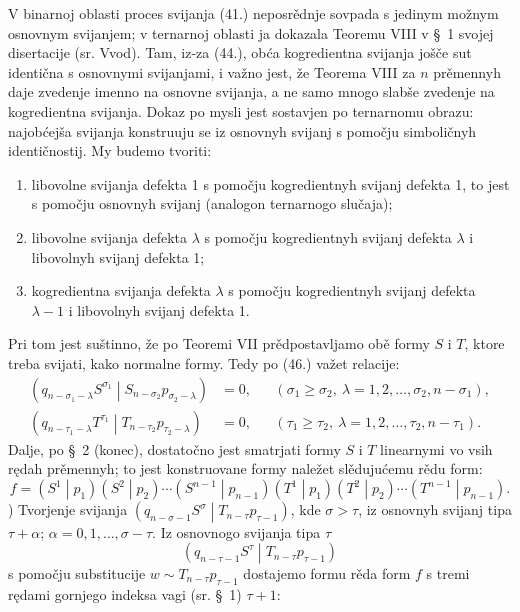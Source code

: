 \documentclass[11pt]{article}
\newcommand{\pair}[2]{\left(#1\middle|#2\right)}
\begin{document}
V binarnoj oblasti proces svijanja (41.) neposrědnje sovpada s jedinym možnym osnovnym svijanjem; v ternarnoj oblasti ja dokazala Teoremu VIII v \S\ 1 svojej disertacije (sr. Vvod). Tam, iz-za (44.), obća kogredientna svijanja jošče sut identična s osnovnymi svijanjami, i važno jest, že Teorema VIII za $n$ prěmennyh daje zvedenje imenno na osnovne svijanja, a ne samo mnogo slabše zvedenje na kogredientna svijanja. Dokaz po mysli jest sostavjen po ternarnomu obrazu: najobćejša svijanja konstruuju se iz osnovnyh svijanj s pomočju simboličnyh identičnostij. My budemo tvoriti:
\begin{enumerate}
\item libovolne svijanja defekta 1 s pomočju kogredientnyh svijanj defekta 1, to jest s pomočju osnovnyh svijanj (analogon ternarnogo slučaja);
\item libovolne svijanja defekta $\lambda$ s pomočju kogredientnyh svijanj defekta $\lambda$ i libovolnyh svijanj defekta 1;
\item kogredientna svijanja defekta $\lambda$ s pomočju kogredientnyh svijanj defekta $\lambda-1$ i libovolnyh svijanj defekta 1.
\end{enumerate}
Pri tom jest suštinno, že po Teoremi VII prědpostavljamo obě formy $S$ i $T$, ktore treba svijati, kako normalne formy. Tedy po (46.) važet relacije:
\begin{equation}
\begin{aligned}
\pair{q_{n-\sigma_1-\lambda}S^{\sigma_1}}{S_{n-\sigma_2}p_{\sigma_2-\lambda}}&=0,
&& (\sigma_1\ge\sigma_2,\ \lambda=1,2,\ldots,\sigma_2,n-\sigma_1),\\
\pair{q_{n-\tau_1-\lambda}T^{\tau_1}}{T_{n-\tau_2}p_{\tau_2-\lambda}}&=0,
&& (\tau_1\ge\tau_2,\ \lambda=1,2,\ldots,\tau_2,n-\tau_1).
\end{aligned}
\tag{62}
\end{equation}
Dalje, po \S\ 2 (konec), dostatočno jest smatrjati formy $S$ i $T$ linearnymi vo vsih rędah prěmennyh; to jest konstruovane formy naležet slědujućemu rědu form:
\[
 f=\pair{S^1}{p_1}\pair{S^2}{p_2}\cdots\pair{S^{n-1}}{p_{n-1}}
   \pair{T^1}{p_1}\pair{T^2}{p_2}\cdots\pair{T^{n-1}}{p_{n-1}}.
\]
) Tvorjenje svijanja $\pair{q_{n-\sigma-1}S^\sigma}{T_{n-\tau}p_{\tau-1}}$, kde $\sigma>\tau$, iz osnovnyh svijanj tipa $\tau+\alpha$; $\alpha=0,1,\ldots,\sigma-\tau$. Iz osnovnogo svijanja tipa $\tau$
\[
 \pair{q_{n-\tau-1}S^\tau}{T_{n-\tau}p_{\tau-1}}
\]
s pomočju substitucije $w\sim T_{n-\tau}p_{\tau-1}$ dostajemo formu rěda form $f$ s tremi rędami gornjego indeksa vagi (sr. \S\ 1) $\tau+1$:
\end{document}
